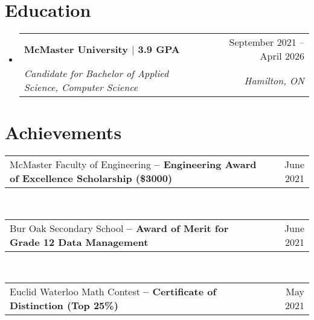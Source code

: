 \documentclass[letterpaper,11pt]{article}
\makeatletter
\newcommand{\resumeSubheading}[4]{
  \vspace{-2pt}\item
    \begin{tabular*}{0.97\textwidth}[t]{l@{\extracolsep{\fill}}r}
      \textbf{#1} & #2 \\
      \textit{\small#3} & \textit{\small #4} \\
    \end{tabular*}\vspace{-7pt}
}
\newcommand{\resumeDatedList}[2]{
    \vspace{-2pt}\item
    \begin{tabular*}{0.97\textwidth}[t]{l@{\extracolsep{\fill}}r}
        #1 & #2 \\
    \end{tabular*}
}
\newcommand{\resumeSubHeadingListStart}{\begin{itemize}[leftmargin=0.15in, label={}]}
\newcommand{\resumeSubHeadingListEnd}{\end{itemize}}
\newcommand{\resumeListStart}{\begin{itemize}[itemindent=-0.33in,leftmargin=0.48in, label={}]}
\newcommand{\resumeListEnd}{\end{itemize}}
\makeatother
\begin{document}
\section{Education}
    \resumeSubHeadingListStart
        \resumeSubheading
            {McMaster University $|$ 3.9 GPA}{September 2021 -- April 2026}
            {Candidate for Bachelor of Applied Science, Computer Science}{Hamilton, ON}
    \resumeSubHeadingListEnd


%
\section{Achievements}
    \resumeListStart\small{
        \resumeDatedList{McMaster Faculty of Engineering \textbf{-- Engineering Award of Excellence Scholarship (\$3000)}}{June 2021} \\
        \resumeDatedList{Bur Oak Secondary School \textbf{-- Award of Merit for Grade 12 Data Management}}{June 2021} \\
        \resumeDatedList{Euclid Waterloo Math Contest \textbf{-- Certificate of Distinction (Top 25\%)}}{May 2021} \\
    } \resumeListEnd

\end{document}
